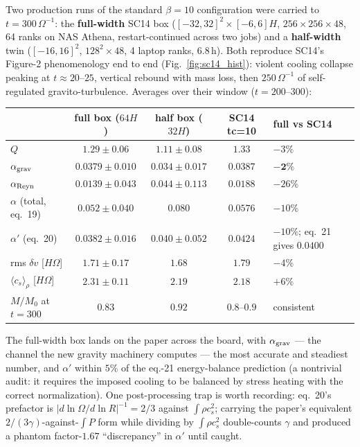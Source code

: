 \documentclass[11pt]{article}
\newcommand{\Om}{\Omega}
\begin{document}
Two production runs of the standard $\beta = 10$ configuration were carried to
$t = 300\,\Om^{-1}$: the \textbf{full-width} SC14 box
($[-32,32]^2\times[-6,6]H$, $256\times256\times48$, 64 ranks on NAS Athena,
restart-continued across two jobs) and a \textbf{half-width} twin
($[-16,16]^2$, $128^2\times48$, 4 laptop ranks, $6.8$\,h). Both reproduce
SC14's Figure-2 phenomenology end to end (Fig.~\ref{fig:sc14_hist}): violent
cooling collapse peaking at $t\approx20$--$25$, vertical rebound with mass
loss, then $250\,\Om^{-1}$ of self-regulated gravito-turbulence. Averages over
their window ($t = 200$--$300$):
\begin{center}
\small
\begin{tabular}{@{}lccc l@{}}
\toprule
 & full box ($64H$) & half box ($32H$) & SC14 tc=10 & full vs SC14\\
\midrule
$Q$ & $1.29\pm0.06$ & $1.11\pm0.08$ & $1.33$ & $-3\%$ \\
$\alpha_{\rm grav}$ & $0.0379\pm0.010$ & $0.034\pm0.017$ & $0.0387$
  & $\mathbf{-2\%}$ \\
$\alpha_{\rm Reyn}$ & $0.0139\pm0.043$ & $0.044\pm0.113$ & $0.0188$
  & $-26\%$\footnotemark \\
$\alpha$ (total, eq.~19) & $0.052\pm0.040$ & $0.080$ & $0.0576$ & $-10\%$ \\
$\alpha'$ (eq.~20) & $0.0382\pm0.016$ & $0.040\pm0.052$ & $0.0424$
  & $-10\%$; eq.~21 gives $0.0400$ \\
rms $\delta v$ [$H\Om$] & $1.71\pm0.17$ & $1.68$ & $1.79$ & $-4\%$ \\
$\langle c_s\rangle_\rho$ [$H\Om$] & $2.31\pm0.11$ & $2.19$ & $2.18$ & $+6\%$ \\
$M/M_0$ at $t{=}300$ & $0.83$ & $0.92$ & $0.8$--$0.9$ & consistent \\
\bottomrule
\end{tabular}
\end{center}

\noindent The full-width box lands on the paper across the board, with
$\alpha_{\rm grav}$ --- the channel the new gravity machinery computes --- the
most accurate and steadiest number, and $\alpha'$ within $5\%$ of the eq.-21
energy-balance prediction (a nontrivial audit: it requires the imposed cooling
to be balanced by stress heating with the correct normalization). One
post-processing trap is worth recording: eq.~20's prefactor is
$|d\ln\Om/d\ln R|^{-1} = 2/3$ against $\int\rho c_s^2$; carrying the paper's
equivalent $2/(3\gamma)$-against-$\int P$ form while dividing by
$\int\rho c_s^2$ double-counts $\gamma$ and produced a phantom factor-$1.67$
``discrepancy'' in $\alpha'$ until caught.
\end{document}
